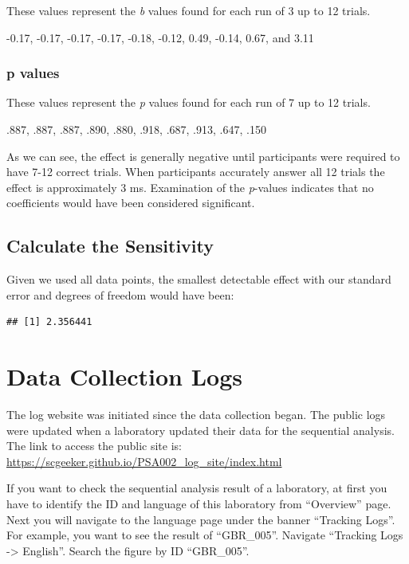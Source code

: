 \documentclass[
  man,floatsintext]{apa7}
\begin{document}
These values represent the \emph{b} values found for each run of 3 up to 12 trials.

-0.17, -0.17, -0.17, -0.17, -0.18, -0.12, 0.49, -0.14, 0.67, and 3.11

\hypertarget{p-values}{%
\subsubsection{p values}\label{p-values}}

These values represent the \emph{p} values found for each run of 7 up to 12 trials.

.887, .887, .887, .890, .880, .918, .687, .913, .647, .150

As we can see, the effect is generally negative until participants were required to have 7-12 correct trials. When participants accurately answer all 12 trials the effect is approximately 3 ms. Examination of the \emph{p}-values indicates that no coefficients would have been considered significant.

\hypertarget{calculate-the-sensitivity}{%
\subsection{Calculate the Sensitivity}\label{calculate-the-sensitivity}}

Given we used all data points, the smallest detectable effect with our standard error and degrees of freedom would have been:

\begin{verbatim}
## [1] 2.356441
\end{verbatim}

\hypertarget{data-collection-logs}{%
\section{Data Collection Logs}\label{data-collection-logs}}

The log website was initiated since the data collection began. The public logs were updated when a laboratory updated their data for the sequential analysis. The link to access the public site is: \url{https://scgeeker.github.io/PSA002_log_site/index.html}

If you want to check the sequential analysis result of a laboratory, at first you have to identify the ID and language of this laboratory from ``Overview'' page. Next you will navigate to the language page under the banner ``Tracking Logs''. For example, you want to see the result of ``GBR\_005''. Navigate ``Tracking Logs -\textgreater{} English''. Search the figure by ID ``GBR\_005''.
\end{document}
